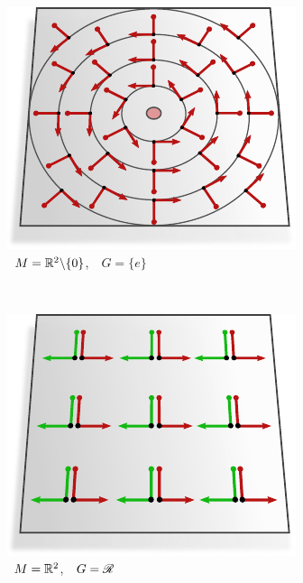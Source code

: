 \hfill
\begin{subfigure}[b]{0.26\textwidth}
    \centering
    \includegraphics[width=1.\textwidth]{figures/G_structure_R2_no_origin_SO2_intro.pdf}
    \captionsetup{format=hang}
    \caption{\small
        \,  $M = \mathbb{R}^2\backslash\{0\}$,
        \,\ $G = \{e\}$
    }
    \label{fig:G_structure_intro_c}
\end{subfigure}
\\[2ex]
% 
% 
% 
% 
\begin{subfigure}[b]{0.26\textwidth}
    \centering
    \includegraphics[width=1.\textwidth]{figures/G_structure_R2_3_big.pdf}
    \captionsetup{format=hang}
    \caption{\small
        \,  $M = \mathbb{R}^2$,
        \,\ $G = \mathscr{R}$
    }
    \label{fig:G_structure_intro_d}
\end{subfigure}
